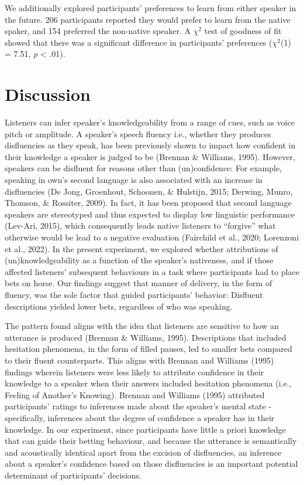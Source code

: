\documentclass[
  man,floatsintext]{apa7}
\begin{document}
We additionally explored participants' preferences to learn from either speaker in the future. 206 participants reported they would prefer to learn from the native spaker, and 154 preferred the non-native speaker. A \(\chi^2\) test of goodness of fit showed that there was a significant difference in participants' preferences (\(\chi^2\)(1) = 7.51, \emph{p} \textless{} .01).

\hypertarget{discussion}{%
\section{Discussion}\label{discussion}}

Listeners can infer speaker's knowledgeability from a range of cues, such as voice pitch or amplitude. A speaker's speech fluency i.e., whether they produces disfluencies as they speak, has been previously shown to impact how confident in their knowledge a speaker is judged to be (Brennan \& Williams, 1995). However, speakers can be disfluent for reasons other than (un)confidence: For example, speaking in own's second language is also associated with an increase in disfluencies (De Jong, Groenhout, Schoonen, \& Hulstijn, 2015; Derwing, Munro, Thomson, \& Rossiter, 2009). In fact, it has been proposed that second language speakers are stereotyped and thus expected to display low linguistic performance (Lev-Ari, 2015), which consequently leads native listeners to ``forgive'' what otherwise would be lead to a negative evaluation (Fairchild et al., 2020; Lorenzoni et al., 2022). In the present experiment, we explored whether attributions of (un)knowledgeability as a function of the speaker's nativeness, and if those affected listeners' subsequent behaviours in a task where participants had to place bets on horse. Our findings suggest that manner of delivery, in the form of fluency, was the sole factor that guided participants' behavior: Disfluent descriptions yielded lower bets, regardless of who was speaking.

The pattern found aligns with the idea that listeners are sensitive to how an utterance is produced (Brennan \& Williams, 1995). Descriptions that included hesitation phenomena, in the form of filled pauses, led to smaller bets compared to their fluent counterparts. This aligns with Brennan and Williams (1995) findings wherein listeners were less likely to attribute confidence in their knowledge to a speaker when their answers included hesitation phenomena (i.e., Feeling of Another's Knowing). Brennan and Williams (1995) attributed participants' ratings to inferences made about the speaker's mental state - specifically, inferences about the degree of confidence a speaker has in their knowledge. In our experiment, since participants have little a priori knowledge that can guide their betting behaviour, and because the utterance is semantically and acoustically identical apart from the excision of disfluencies, an inference about a speaker's confidence based on those disfluencies is an important potential determinant of participants' decisions.
\end{document}
